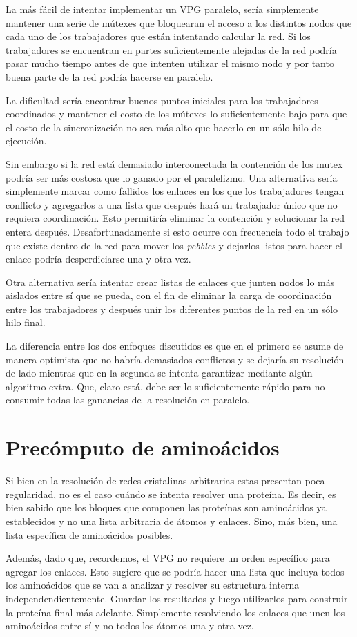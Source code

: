 La más fácil de intentar implementar un VPG paralelo, sería simplemente mantener una serie de mútexes que bloquearan el acceso a los distintos nodos que cada uno de los trabajadores que están intentando calcular la red. Si los trabajadores se encuentran en partes suficientemente alejadas de la red podría pasar mucho tiempo antes de que intenten utilizar el mismo nodo y por tanto buena parte de la red podría hacerse en paralelo.

La dificultad sería encontrar buenos puntos iniciales para los trabajadores coordinados y mantener el costo de los mútexes lo suficientemente bajo para que el costo de la sincronización no sea más alto que hacerlo en un sólo hilo de ejecución.

Sin embargo si la red está demasiado interconectada la contención de los mutex podría ser más costosa que lo ganado por el paralelizmo. Una alternativa sería simplemente marcar como fallidos los enlaces en los que los trabajadores tengan conflicto y agregarlos a una lista que después hará un trabajador único que no requiera coordinación. Esto permitiría eliminar la contención y solucionar la red entera después. Desafortunadamente si esto ocurre con frecuencia todo el trabajo que existe dentro de la red para mover los \emph{pebbles} y dejarlos listos para hacer el enlace podría desperdiciarse una y otra vez.

Otra alternativa sería intentar crear listas de enlaces que junten nodos lo más aislados entre sí que se pueda, con el fin de eliminar la carga de coordinación entre los trabajadores y después unir los diferentes puntos de la red en un sólo hilo final. 

La diferencia entre los dos enfoques discutidos es que en el primero se asume de manera optimista que no habría demasiados conflictos y se dejaría su resolución de lado mientras que en la segunda se intenta garantizar mediante algún algoritmo extra. Que, claro está, debe ser lo suficientemente rápido para no consumir todas las ganancias de la resolución en paralelo.

\section{Precómputo de aminoácidos}
Si bien en la resolución de redes cristalinas arbitrarias estas presentan poca regularidad, no es el caso cuándo se intenta resolver una proteína. Es decir, es bien sabido que los bloques que componen las proteínas son aminoácidos ya establecidos y no una lista arbitraria de átomos y enlaces. Sino, más bien, una lista específica de aminoácidos posibles.

Además, dado que, recordemos, el VPG no requiere un orden específico para agregar los enlaces. Esto sugiere que se podría hacer una lista que incluya todos los aminoácidos que se van a analizar y resolver su estructura interna independendientemente. Guardar los resultados y luego utilizarlos para construir la proteína final más adelante. Simplemente resolviendo los enlaces que unen los aminoácidos entre sí y no todos los átomos una y otra vez.